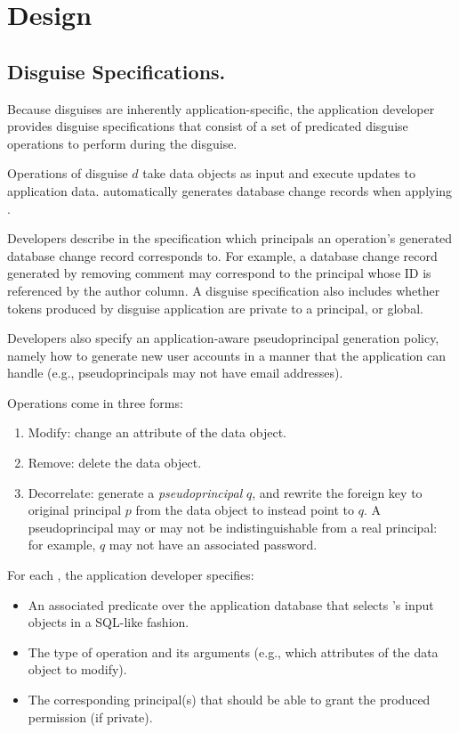 \section{Design} 

\subsection{Disguise Specifications.} 
Because disguises are inherently application-specific, the application developer provides disguise
specifications that consist of a set of predicated disguise operations  to perform during the
disguise.

Operations  of disguise $d$ take data objects as input and execute updates to application
data.
\sys automatically generates database change records when applying . 

Developers describe in the specification which principals an operation's generated database change record corresponds to. 
For example, a database change record generated by removing comment may correspond to the principal whose ID is referenced by the author column.  
A disguise specification also includes whether tokens produced by disguise application are private
to a principal, or global.

Developers also specify an application-aware pseudoprincipal generation policy, namely how to generate new
user accounts in a manner that the application can handle (e.g., pseudoprincipals may not have email
addresses).

\vspace{6pt}\noindent
Operations come in three forms:
\begin{enumerate}
    \item Modify: change an attribute of the data object.
    \item Remove: delete the data object.
    \item Decorrelate: generate a \emph{pseudoprincipal} $q$, and rewrite the foreign key to original
        principal $p$ from the data object to instead point to $q$.
        A pseudoprincipal may or may not be indistinguishable from a real principal: for example,
        $q$ may not have an associated password.
\end{enumerate}

\noindent For each , the application developer specifies:
\begin{itemize}
    \item An associated predicate over the application database that selects 's input
        objects in a SQL-like fashion.
    \item The type of operation and its arguments (e.g., which attributes of the data object to
        modify).
    \item The corresponding principal(s) that should be able to grant the produced permission (if
        private).
\end{itemize}


